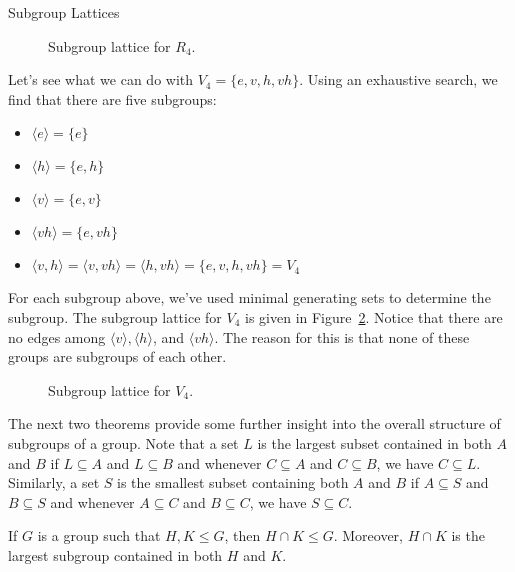 \begin{section}{Subgroup Lattices}
\begin{figure}[!ht]
\caption{Subgroup lattice for $R_4$.}
\label{fig:latticeR4}
\end{figure}

Let's see what we can do with $V_4=\{e,v,h,vh\}$.  Using an exhaustive search, we find that there are five subgroups:
\begin{itemize}
\item[] $\langle e \rangle = \{e\}$
\item[] $\langle h \rangle  = \{e,h\}$
\item[] $\langle v \rangle  = \{e,v\}$
\item[] $\langle vh \rangle  = \{e,vh\}$
\item[] $\langle v,h \rangle = \langle v,vh\rangle = \langle h, vh\rangle= \{e,v,h,vh\}=V_4$
\end{itemize}
For each subgroup above, we've used minimal generating sets to determine the subgroup.  The subgroup lattice for $V_4$ is given in Figure~\ref{fig:latticeV4}. Notice that there are no edges among $\langle v\rangle, \langle h\rangle$, and $\langle vh\rangle$.  The reason for this is that none of these groups are subgroups of each other.

\begin{figure}[!ht]
\centering
{}
\caption{Subgroup lattice for $V_4$.}
\label{fig:latticeV4}
\end{figure}

The next two theorems provide some further insight into the overall structure of subgroups of a group.  Note that a set $L$ is the largest subset contained in both $A$ and $B$ if $L\subseteq A$ and $L\subseteq B$ and whenever $C\subseteq A$ and $C\subseteq B$, we have $C\subseteq L$.  Similarly, a set $S$ is the smallest subset containing both $A$ and $B$ if $A\subseteq S$ and $B\subseteq S$ and whenever $A\subseteq C$ and $B\subseteq C$, we have $S\subseteq C$.

\begin{theorem}\label{thm:subgroup_intersection}
If $G$ is a group such that $H,K\leq G$, then $H\cap K\leq G$. Moreover, $H\cap K$ is the largest subgroup contained in both $H$ and $K$.
\end{theorem}


\end{section}
